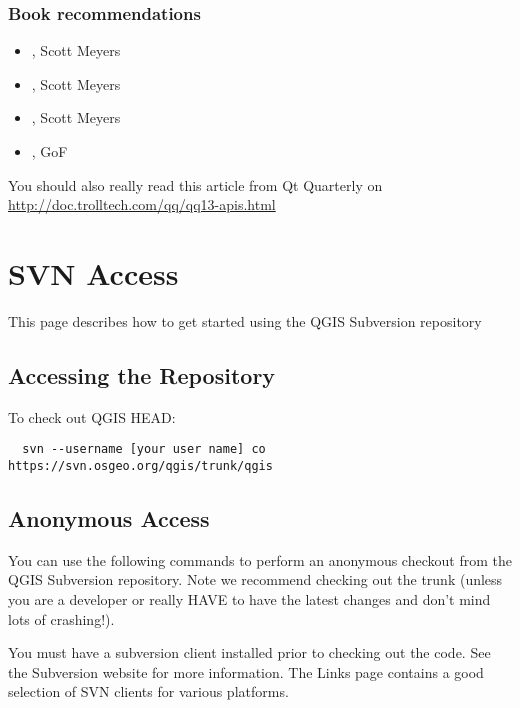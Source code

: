 \hypertarget{toc28}{}
\subsubsection{Book recommendations}
\begin{itemize}
\item {}, Scott Meyers
\item {}, Scott Meyers
\item {}, Scott Meyers
\item {}, GoF
\end{itemize}


You should also really read this article from Qt Quarterly on \\
\url{http://doc.trolltech.com/qq/qq13-apis.html}


\hypertarget{toc29}{}
\section{SVN Access}
This page describes how to get started using the QGIS Subversion repository

\hypertarget{toc30}{}
\subsection{Accessing the Repository}
To check out QGIS HEAD:

\begin{verbatim}
  svn --username [your user name] co https://svn.osgeo.org/qgis/trunk/qgis
\end{verbatim}

\hypertarget{toc31}{}
\subsection{Anonymous Access}
You can use the following commands to perform an anonymous checkout from the
QGIS Subversion repository.  Note we recommend checking out the trunk (unless
you are a developer or really HAVE to have the latest changes and don't mind
lots of crashing!).

You must have a subversion client installed prior to checking out the code. See
the Subversion website for more information. The Links page contains a good
selection of SVN clients for various platforms.

